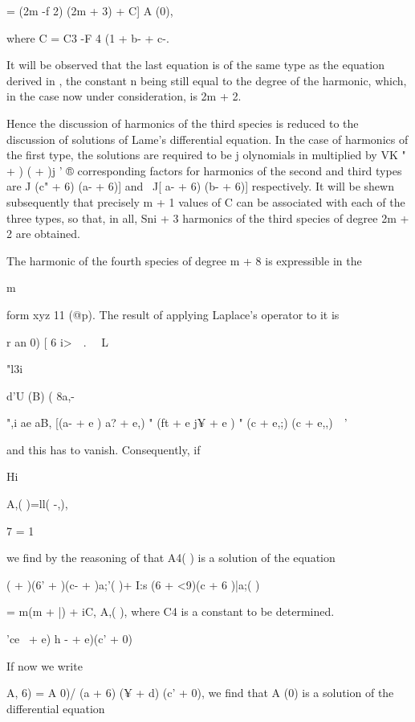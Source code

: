 {= (2m -f 2) (2m + 3) + C] A (0),

where C = C3 -F 4 (1 + b- + c-.

It will be observed that the last equation is of the same type as the
equation derived in , the constant n being still equal to the
degree of the harmonic, which, in the case now under consideration, is
2m + 2.

Hence the discussion of harmonics of the third species is reduced to
the discussion of solutions of Lame's differential equation. In the
case of harmonics of the first type, the solutions are required to be
j olynomials in multiplied by VK " + ) ( + )j ' ® corresponding
factors for harmonics of the second and third types are J (c" + 6) (a-
+ 6)] and \ J[ a- + 6) (b- + 6)] respectively. It will be shewn
subsequently that precisely m + 1 values of C can be associated with
each of the three types, so that, in all, Sni + 3 harmonics of the
third species of degree 2m + 2 are obtained.


The harmonic of the fourth species of degree m + 8 is expressible in
the

m

form xyz 11 (@p). The result of applying Laplace's operator to it is

r an 0) [ 6 i>\ \ . \ \ L

"l3i %

  d'U (B) ( 8a,- \ %

",i ae aB, [(a- + e ) a? + e,) " (ft + e j¥ + e ) " (c + e,;) (c +
e,,)\ \ '

and this has to vanish. Consequently, if

Hi

A,( )=ll( -,),

7 = 1

we find by the reasoning of  that A4( ) is a solution of the
equation

( + )(6' + )(c- + )a;'( )+ I:s (6 + <9)(c + 6 )|a;( )

= m(m + |) + iC, A,( ), where C4 is a constant to be determined.

 'ce~ + e) h - + e)(c' + 0) ~

%
%

If now we write

A, 6) = A 0)/ (a + 6) (¥ + d) (c' + 0), we find that A (0) is a
solution of the differential equation

}
